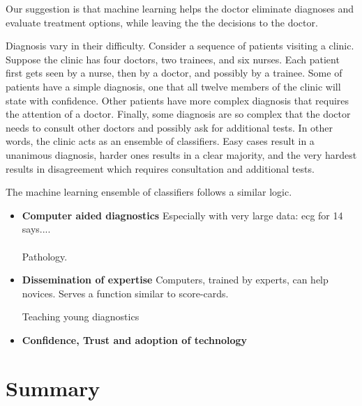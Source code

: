 \documentclass[9pt,twocolumn,twoside]{pnas-new}
\begin{document}
  Our suggestion is that machine learning helps the doctor eliminate
  diagnoses and evaluate treatment options, while leaving the the
  decisions to the doctor.

  Diagnosis vary in their difficulty. Consider a sequence of
  patients visiting a clinic. Suppose the clinic has four doctors, two
  trainees, and six nurses. Each patient first gets seen by a nurse,
  then by a doctor, and possibly by a trainee. Some of patients have
  a simple diagnosis, one that all twelve members of the clinic will
  state with confidence. Other patients have more complex diagnosis
  that requires the attention of a doctor. Finally, some diagnosis are
  so complex that the doctor needs to consult other doctors and
  possibly ask for additional tests. In other words, the clinic acts
  as an ensemble of classifiers. Easy cases result in a unanimous
  diagnosis, harder ones results in a clear majority, and the very
  hardest results in disagreement which requires consultation and
  additional tests.

  The machine learning ensemble of classifiers follows a similar
  logic. 

\begin{itemize}
\item{\bf Computer aided diagnostics}
  Especially with very large data: ecg for 14 says.... \\
  ~\\

Pathology.

\item {\bf Dissemination of expertise}
Computers, trained by experts, can help novices.  Serves a function
similar to score-cards.

Teaching young diagnostics
\item { \bf Confidence, Trust and adoption of technology}
\end{itemize}

\section*{Summary}

% 

\end{document}
